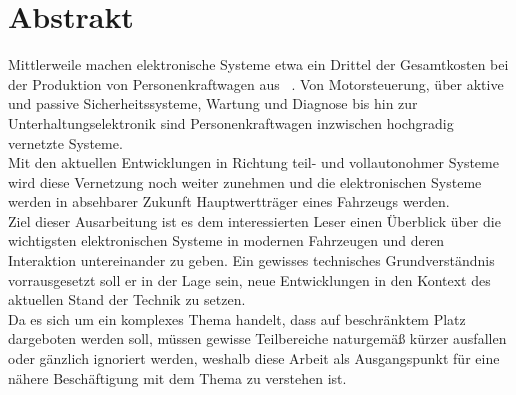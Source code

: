 \section{Abstrakt}
Mittlerweile machen elektronische Systeme etwa ein Drittel der Gesamtkosten bei der Produktion von
Personenkraftwagen aus ~\cite{.BP02}. Von Motorsteuerung, über aktive und passive Sicherheitssysteme, 
Wartung und Diagnose bis hin zur Unterhaltungselektronik sind Personenkraftwagen inzwischen hochgradig
vernetzte Systeme.\\

Mit den aktuellen Entwicklungen in Richtung teil- und vollautonohmer Systeme wird diese Vernetzung noch weiter zunehmen 
und die elektronischen Systeme werden in absehbarer Zukunft Hauptwertträger eines Fahrzeugs werden.\\

Ziel dieser Ausarbeitung ist es dem interessierten Leser einen Überblick über die wichtigsten elektronischen Systeme in
modernen Fahrzeugen und deren Interaktion untereinander zu geben. Ein gewisses technisches Grundverständnis vorrausgesetzt 
soll er in der Lage sein, neue Entwicklungen in den Kontext des aktuellen Stand der Technik zu setzen.\\

Da es sich um ein komplexes Thema handelt, dass auf beschränktem Platz dargeboten werden soll, müssen gewisse Teilbereiche naturgemäß
kürzer ausfallen oder gänzlich ignoriert werden, weshalb diese Arbeit als Ausgangspunkt für eine nähere Beschäftigung mit dem Thema
zu verstehen ist.